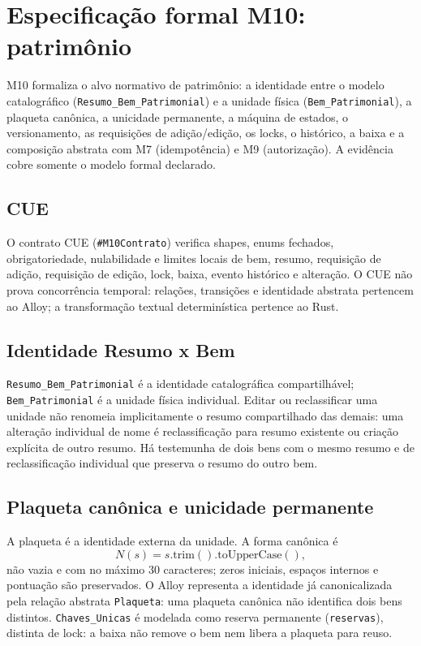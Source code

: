 \clearpage
\section{Especificação formal M10: patrimônio}
\label{sec:formal-m10}
\sloppy

M10 formaliza o alvo normativo de patrimônio: a identidade entre o modelo
catalográfico (\texttt{Resumo\_Bem\_Patrimonial}) e a unidade física
(\texttt{Bem\_Patrimonial}), a plaqueta canônica, a unicidade permanente, a
máquina de estados, o versionamento, as requisições de adição/edição, os locks,
o histórico, a baixa e a composição abstrata com M7 (idempotência) e M9
(autorização). A evidência cobre somente o modelo formal declarado.

\subsection*{CUE}
O contrato CUE (\texttt{\#M10Contrato}) verifica shapes, enums fechados,
obrigatoriedade, nulabilidade e limites locais de bem, resumo, requisição de
adição, requisição de edição, lock, baixa, evento histórico e alteração. O CUE
não prova concorrência temporal: relações, transições e identidade abstrata
pertencem ao Alloy; a transformação textual determinística pertence ao Rust.

\subsection*{Identidade Resumo x Bem}
\texttt{Resumo\_Bem\_Patrimonial} é a identidade catalográfica compartilhável;
\texttt{Bem\_Patrimonial} é a unidade física individual. Editar ou reclassificar
uma unidade não renomeia implicitamente o resumo compartilhado das demais: uma
alteração individual de nome é reclassificação para resumo existente ou criação
explícita de outro resumo. Há testemunha de dois bens com o mesmo resumo e de
reclassificação individual que preserva o resumo do outro bem.

\subsection*{Plaqueta canônica e unicidade permanente}
A plaqueta é a identidade externa da unidade. A forma canônica é
\[ N(s) = s.\mathrm{trim}().\mathrm{toUpperCase}(), \]
não vazia e com no máximo 30
caracteres; zeros iniciais, espaços internos e pontuação são preservados. O
Alloy representa a identidade já canonicalizada pela relação abstrata
\texttt{Plaqueta}: uma plaqueta canônica não identifica dois bens distintos.
\texttt{Chaves\_Unicas} é modelada como reserva permanente (\texttt{reservas}),
distinta de lock: a baixa não remove o bem nem libera a plaqueta para reuso.

